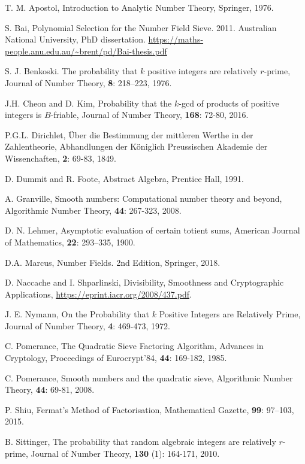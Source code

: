 \documentclass[12pt]{amsart}
\theoremstyle{definition}
\begin{document}
\begin{thebibliography}{1}

 T. M. Apostol, Introduction to Analytic Number Theory, Springer, 1976.

 S. Bai, Polynomial Selection for the Number Field Sieve. 2011. Australian National University, PhD dissertation. \url{https://maths-people.anu.edu.au/~brent/pd/Bai-thesis.pdf}

 S. J. Benkoski. The probability that $k$ positive integers are relatively $r$-prime, Journal of Number Theory, \textbf{8}: 218–223, 1976.

 J.H. Cheon and D. Kim, Probability that the $k$-gcd of products of positive integers is $B$-friable, Journal of Number Theory, \textbf{168}: 72-80, 2016.

 P.G.L. Dirichlet, \"{U}ber die Bestimmung der mittleren Werthe in der Zahlentheorie, Abhandlungen der K\"{o}niglich Preussischen Akademie der Wissenchaften, \textbf{2}: 69-83, 1849.

 D. Dummit and R. Foote, Abstract Algebra, Prentice Hall, 1991.

 A. Granville, Smooth numbers: Computational number theory and beyond, Algorithmic Number Theory, \textbf{44}: 267-323, 2008.

 D. N. Lehmer, Asymptotic evaluation of certain totient sums, American Journal of Mathematics, \textbf{22}: 293–335, 1900.

 D.A. Marcus, Number Fields. 2nd Edition, Springer, 2018.

 D. Naccache and I. Shparlinski, Divisibility, Smoothness and Cryptographic Applications,
\url{https://eprint.iacr.org/2008/437.pdf}. 

 J. E. Nymann, On the Probability that $k$ Positive Integers are Relatively Prime, Journal of Number Theory, \textbf{4}: 469-473, 1972.

 C. Pomerance, The Quadratic Sieve Factoring Algorithm, Advances in Cryptology, Proceedings of Eurocrypt’84, \textbf{44}: 169-182, 1985.

 C. Pomerance, Smooth numbers and the quadratic sieve, Algorithmic Number Theory, \textbf{44}: 69-81, 2008.

 P. Shiu, Fermat’s Method of Factorisation, Mathematical Gazette, \textbf{99}: 97–103, 2015.

 B. Sittinger, The probability that random algebraic integers are relatively $r$-prime, Journal of Number Theory, \textbf{130} (1): 164-171, 2010.


\end{thebibliography}
\end{document}

